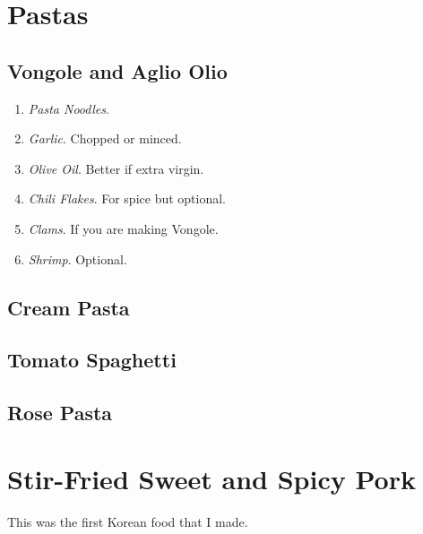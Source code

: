 \documentclass{article}
\begin{document}
\section{Pastas} 

  \subsection{Vongole and Aglio Olio}

    \begin{definition}
      \begin{enumerate}
        \item \textit{Pasta Noodles}.
        \item \textit{Garlic}. Chopped or minced. 
        \item \textit{Olive Oil}. Better if extra virgin. 
        \item \textit{Chili Flakes}. For spice but optional. 
        \item \textit{Clams}. If you are making Vongole. 
        \item \textit{Shrimp}. Optional. 
      \end{enumerate}
    \end{definition}

    \begin{theorem}
      
    \end{theorem} 

  \subsection{Cream Pasta} 

  \subsection{Tomato Spaghetti}

  \subsection{Rose Pasta}

\section{Stir-Fried Sweet and Spicy Pork} 

  This was the first Korean food that I made. 
\end{document}
